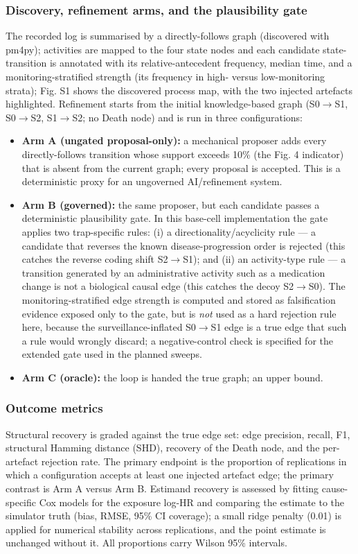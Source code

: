 \documentclass[sn-vancouver-num]{sn-jnl}
\begin{document}
\subsubsection{Discovery, refinement arms, and the plausibility gate}
The recorded log is summarised by a directly-follows graph (discovered with pm4py); activities are mapped to the four state nodes and each candidate state-transition is annotated with its relative-antecedent frequency, median time, and a monitoring-stratified strength (its frequency in high- versus low-monitoring strata); Fig. S1 shows the discovered process map, with the two injected artefacts highlighted. Refinement starts from the initial knowledge-based graph (S0$\rightarrow$S1, S0$\rightarrow$S2, S1$\rightarrow$S2; no Death node) and is run in three configurations:
\begin{itemize}
    \item \textbf{Arm A (ungated proposal-only):} a mechanical proposer adds every directly-follows transition whose support exceeds 10\% (the Fig. 4 indicator) that is absent from the current graph; every proposal is accepted. This is a deterministic proxy for an ungoverned AI/refinement system.
    \item \textbf{Arm B (governed):} the same proposer, but each candidate passes a deterministic plausibility gate. In this base-cell implementation the gate applies two trap-specific rules: (i) a directionality/acyclicity rule --- a candidate that reverses the known disease-progression order is rejected (this catches the reverse coding shift S2$\rightarrow$S1); and (ii) an activity-type rule --- a transition generated by an administrative activity such as a medication change is not a biological causal edge (this catches the decoy S2$\rightarrow$S0). The monitoring-stratified edge strength is computed and stored as falsification evidence exposed only to the gate, but is \textit{not} used as a hard rejection rule here, because the surveillance-inflated S0$\rightarrow$S1 edge is a true edge that such a rule would wrongly discard; a negative-control check is specified for the extended gate used in the planned sweeps.
    \item \textbf{Arm C (oracle):} the loop is handed the true graph; an upper bound.
\end{itemize}

\subsubsection{Outcome metrics}
Structural recovery is graded against the true edge set: edge precision, recall, F1, structural Hamming distance (SHD), recovery of the Death node, and the per-artefact rejection rate. The primary endpoint is the proportion of replications in which a configuration accepts at least one injected artefact edge; the primary contrast is Arm A versus Arm B. Estimand recovery is assessed by fitting cause-specific Cox models for the exposure log-HR and comparing the estimate to the simulator truth (bias, RMSE, 95\% CI coverage); a small ridge penalty (0.01) is applied for numerical stability across replications, and the point estimate is unchanged without it. All proportions carry Wilson 95\% intervals.
\end{document}
